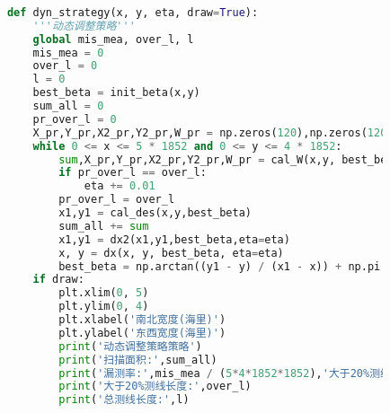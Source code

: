 \documentclass[withoutpreface,bwprint]{cumcmthesis} %
\begin{document}
\begin{appendices}
\begin{lstlisting}[language=python]
            
            def dyn_strategy(x, y, eta, draw=True):
                '''动态调整策略'''
                global mis_mea, over_l, l
                mis_mea = 0
                over_l = 0
                l = 0
                best_beta = init_beta(x,y)
                sum_all = 0
                pr_over_l = 0
                X_pr,Y_pr,X2_pr,Y2_pr,W_pr = np.zeros(120),np.zeros(120),np.zeros(120),np.zeros(120),np.zeros(120)
                while 0 <= x <= 5 * 1852 and 0 <= y <= 4 * 1852:
                    sum,X_pr,Y_pr,X2_pr,Y2_pr,W_pr = cal_W(x,y, best_beta,X_pr,Y_pr,X2_pr,Y2_pr,W_pr,draw=draw)
                    if pr_over_l == over_l:
                        eta += 0.01
                    pr_over_l = over_l
                    x1,y1 = cal_des(x,y,best_beta)
                    sum_all += sum
                    x1,y1 = dx2(x1,y1,best_beta,eta=eta)
                    x, y = dx(x, y, best_beta, eta=eta)
                    best_beta = np.arctan((y1 - y) / (x1 - x)) + np.pi / 2
                if draw:
                    plt.xlim(0, 5)
                    plt.ylim(0, 4)
                    plt.xlabel('南北宽度(海里)')
                    plt.ylabel('东西宽度(海里)')
                    print('动态调整策略策略')
                    print('扫描面积:',sum_all)
                    print('漏测率:',mis_mea / (5*4*1852*1852),'大于20%测线长度占比:',over_l / l)
                    print('大于20%测线长度:',over_l)
                    print('总测线长度:',l)
            

\end{lstlisting}
\end{appendices}
\end{document}
